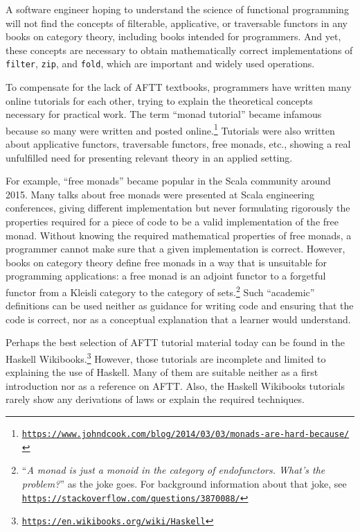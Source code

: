 A software engineer hoping to understand the science of functional
programming will not find the concepts of filterable, applicative,
or traversable functors in any books on category theory, including
books intended for programmers. And yet, these concepts are necessary
to obtain mathematically correct implementations of \lstinline!filter!,
\lstinline!zip!, and \lstinline!fold!, which are important and widely
used operations.

To compensate for the lack of AFTT textbooks, programmers have written
many online tutorials for each other, trying to explain the theoretical
concepts necessary for practical work. The term ``monad tutorial''
became infamous because so many were written and posted online.\footnote{\texttt{\href{https://www.johndcook.com/blog/2014/03/03/monads-are-hard-because/}{https://www.johndcook.com/blog/2014/03/03/monads-are-hard-because/}}}
Tutorials were also written about applicative functors, traversable
functors, free monads, etc., showing a real unfulfilled need for presenting
relevant theory in an applied setting. 

For example, ``free monads'' became popular in the Scala community
around 2015. Many talks about free monads were presented at Scala
engineering conferences, giving different implementation but never
formulating rigorously the properties required for a piece of code
to be a valid implementation of the free monad. Without knowing the
required mathematical properties of free monads, a programmer cannot
make sure that a given implementation is correct. However, books on
category theory define free monads in a way that is unsuitable for
programming applications: a free monad is an adjoint functor to a
forgetful functor from a Kleisli category to the category of sets.\footnote{``\emph{A monad is just a monoid in the category of endofunctors.
What's the problem?}'' as the joke goes. For background information
about that joke, see \texttt{\href{https://stackoverflow.com/questions/3870088/}{https://stackoverflow.com/questions/3870088/}}} Such ``academic'' definitions can be used neither as guidance for
writing code and ensuring that the code is correct, nor as a conceptual
explanation that a learner would understand.

Perhaps the best selection of AFTT tutorial material today can be
found in the Haskell Wikibooks.\footnote{\texttt{\href{https://en.wikibooks.org/wiki/Haskell}{https://en.wikibooks.org/wiki/Haskell}}}
However, those tutorials are incomplete and limited to explaining
the use of Haskell. Many of them are suitable neither as a first introduction
nor as a reference on AFTT. Also, the Haskell Wikibooks tutorials
rarely show any derivations of laws or explain the required techniques.

